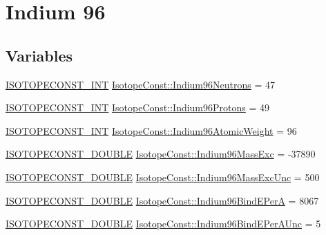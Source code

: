 \hypertarget{group___isotope_const-_indium-_in96}{}\section{Indium 96}
\label{group___isotope_const-_indium-_in96}
\subsection*{Variables}
\begin{DoxyCompactItemize}
\item 
\mbox{\hyperlink{group___isotope_const-_macros_ga5f18360b3e99483a35c32d789e62621c}{I\+S\+O\+T\+O\+P\+E\+C\+O\+N\+S\+T\+\_\+\+I\+NT}} \mbox{\hyperlink{group___isotope_const-_indium-_in96_ga38e41e12c51d76df1fffa0815197f401}{Isotope\+Const\+::\+Indium96\+Neutrons}} = 47
\item 
\mbox{\hyperlink{group___isotope_const-_macros_ga5f18360b3e99483a35c32d789e62621c}{I\+S\+O\+T\+O\+P\+E\+C\+O\+N\+S\+T\+\_\+\+I\+NT}} \mbox{\hyperlink{group___isotope_const-_indium-_in96_gad983fd14b4eaa3d80995a60136e372a8}{Isotope\+Const\+::\+Indium96\+Protons}} = 49
\item 
\mbox{\hyperlink{group___isotope_const-_macros_ga5f18360b3e99483a35c32d789e62621c}{I\+S\+O\+T\+O\+P\+E\+C\+O\+N\+S\+T\+\_\+\+I\+NT}} \mbox{\hyperlink{group___isotope_const-_indium-_in96_gabdb3ff4d94724013c26aba3220b99a2e}{Isotope\+Const\+::\+Indium96\+Atomic\+Weight}} = 96
\item 
\mbox{\hyperlink{group___isotope_const-_macros_ga8f45a7272ce02c0b4c65c44636ed719a}{I\+S\+O\+T\+O\+P\+E\+C\+O\+N\+S\+T\+\_\+\+D\+O\+U\+B\+LE}} \mbox{\hyperlink{group___isotope_const-_indium-_in96_ga2519fdf87e391ab7efd45fb2ea44fc0f}{Isotope\+Const\+::\+Indium96\+Mass\+Exc}} = -\/37890
\item 
\mbox{\hyperlink{group___isotope_const-_macros_ga8f45a7272ce02c0b4c65c44636ed719a}{I\+S\+O\+T\+O\+P\+E\+C\+O\+N\+S\+T\+\_\+\+D\+O\+U\+B\+LE}} \mbox{\hyperlink{group___isotope_const-_indium-_in96_gae132300fa808ee8aa34257d4ee2560c3}{Isotope\+Const\+::\+Indium96\+Mass\+Exc\+Unc}} = 500
\item 
\mbox{\hyperlink{group___isotope_const-_macros_ga8f45a7272ce02c0b4c65c44636ed719a}{I\+S\+O\+T\+O\+P\+E\+C\+O\+N\+S\+T\+\_\+\+D\+O\+U\+B\+LE}} \mbox{\hyperlink{group___isotope_const-_indium-_in96_ga411cc2f74df59d2e1fd00db51c544d88}{Isotope\+Const\+::\+Indium96\+Bind\+E\+PerA}} = 8067
\item 
\mbox{\hyperlink{group___isotope_const-_macros_ga8f45a7272ce02c0b4c65c44636ed719a}{I\+S\+O\+T\+O\+P\+E\+C\+O\+N\+S\+T\+\_\+\+D\+O\+U\+B\+LE}} \mbox{\hyperlink{group___isotope_const-_indium-_in96_ga4d9bc0af50c518756f084e7e59e0f91b}{Isotope\+Const\+::\+Indium96\+Bind\+E\+Per\+A\+Unc}} = 5

\end{DoxyCompactItemize}
